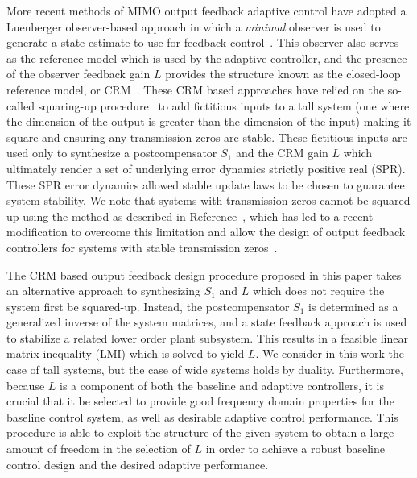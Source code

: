 \documentclass[]{../sty/JGCD}
\theoremstyle{examplestyle}
\begin{document}
  More recent methods of MIMO output feedback adaptive control have adopted a Luenberger observer-based approach in which a \textit{minimal} observer is used to generate a state estimate to use for feedback control\ \cite{lavretsky.output.2010,wise.obltrdesign.2013,qu.gnc.2013,lavretskywise.book.2013}.
  This observer also serves as the reference model which is used by the adaptive controller, and the presence of the observer feedback gain $L$ provides the structure known as the closed-loop reference model, or CRM\ \cite{gibson.aiaacrm.2012,gibson.ecc.2013,gibson.ieeeaccess.2013,gibson.acc.2013}.
  These CRM based approaches have relied on the so-called squaring-up procedure\ \cite{misra.squareup.1992} to add fictitious inputs to a tall system (one where the dimension of the output is greater than the dimension of the input) making it square and ensuring any transmission zeros are stable.
  These fictitious inputs are used only to synthesize a postcompensator $S_{1}$ and the CRM gain $L$ which ultimately render a set of underlying error dynamics strictly positive real (SPR).
  These SPR error dynamics allowed stable update laws to be chosen to guarantee system stability.
  We note that systems with transmission zeros cannot be squared up using the method as described in Reference\ \cite{misra.squareup.1992}, which has led to a recent modification to overcome this limitation and allow the design of output feedback controllers for systems with stable transmission zeros\ \cite{quwiese.ifac.2014}.

  The CRM based output feedback design procedure proposed in this paper takes an alternative approach to synthesizing $S_{1}$ and $L$ which does not require the system first be squared-up.
  Instead, the postcompensator $S_{1}$ is determined as a generalized inverse of the system matrices, and a state feedback approach is used to stabilize a related lower order plant subsystem.
  This results in a feasible linear matrix inequality (LMI) which is solved to yield $L$.
  We consider in this work the case of tall systems, but the case of wide systems holds by duality.
  Furthermore, because $L$ is a component of both the baseline and adaptive controllers, it is crucial that it be selected to provide good frequency domain properties for the baseline control system, as well as desirable adaptive control performance.
  This procedure is able to exploit the structure of the given system to obtain a large amount of freedom in the selection of $L$ in order to achieve a robust baseline control design and the desired adaptive performance.
\end{document}

